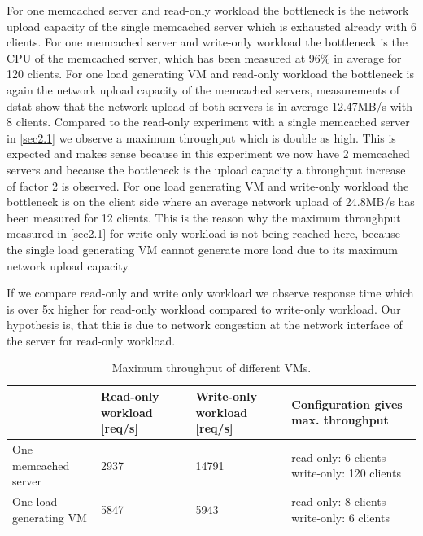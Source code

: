 \documentclass[11pt,a4paper]{article}
\begin{document}
For one memcached server and read-only workload the bottleneck is the network upload capacity of the single memcached server which is exhausted already with 6 clients.
For one memcached server and write-only workload the bottleneck is the CPU of the memcached server, which has been measured at 96\% in average for 120 clients.
For one load generating VM and read-only workload the bottleneck is again the network upload capacity of the memcached servers, measurements of dstat show that the network upload of both servers is in average 12.47MB/s with 8 clients. Compared to the read-only experiment with a single memcached server in \autoref{sec2.1} we observe a maximum throughput which is double as high. This is expected and makes sense because in this experiment we now have 2 memcached servers and because the bottleneck is the upload capacity a throughput increase of factor 2 is observed.
For one load generating VM and write-only workload the bottleneck is on the client side where an average network upload of 24.8MB/s has been measured for 12 clients. This is the reason why the maximum throughput measured in \autoref{sec2.1} for write-only workload is not being reached here, because the single load generating VM cannot generate more load due to its maximum network upload capacity.

If we compare read-only and write only workload we observe response time which is over 5x higher for read-only workload compared to write-only workload. Our hypothesis is, that this is due to network congestion at the network interface of the server for read-only workload.


\begin{center}
\begin{table}[H]
	\begin{tabular}{|l|p{2cm}|p{2cm}|p{7cm}|}
		\hline                        & Read-only workload [req/s] & Write-only workload [req/s] & Configuration gives max. throughput \\ 
		\hline One memcached server   &          2937          &      14791               &            read-only: 6 clients \newline write-only: 120 clients                         \\ 
		\hline One load generating VM &        5847            &          5943           &         read-only: 8 clients \newline write-only: 6 clients                            \\ 
		\hline 
	\end{tabular}
	\caption{Maximum throughput of different VMs.}
	\label{sec2res}
\end{table}
\end{center}
\end{document}

